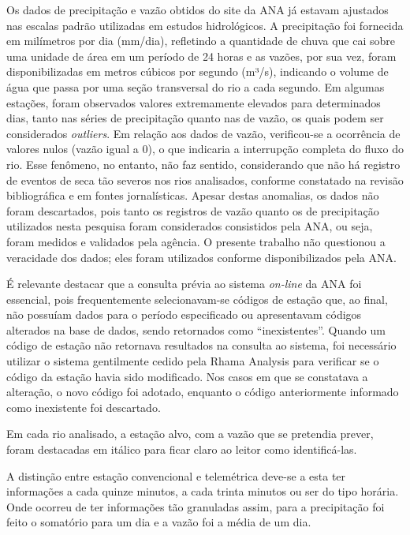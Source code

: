 Os dados de precipitação e vazão obtidos do site da ANA já estavam ajustados nas escalas padrão utilizadas em estudos hidrológicos. A precipitação foi fornecida em milímetros por dia (mm/dia), refletindo a quantidade de chuva que cai sobre uma unidade de área em um período de 24 horas e as vazões, por sua vez, foram disponibilizadas em metros cúbicos por segundo (m³/s), indicando o volume de água que passa por uma seção transversal do rio a cada segundo. Em algumas estações, foram observados valores extremamente elevados para determinados dias, tanto nas séries de precipitação quanto nas de vazão, os quais podem ser considerados \textit{outliers}. Em relação aos dados de vazão, verificou-se a ocorrência de valores nulos (vazão igual a 0), o que indicaria a interrupção completa do fluxo do rio. Esse fenômeno, no entanto, não faz sentido, considerando que não há registro de eventos de seca tão severos nos rios analisados, conforme constatado na revisão bibliográfica e em fontes jornalísticas. Apesar destas anomalias, os dados não foram descartados, pois tanto os registros de vazão quanto os de precipitação utilizados nesta pesquisa foram considerados consistidos pela ANA, ou seja, foram medidos e validados pela agência. O presente trabalho não questionou a veracidade dos dados; eles foram utilizados conforme disponibilizados pela ANA.

É relevante destacar que a consulta prévia ao sistema \textit{on-line} da ANA foi essencial, pois frequentemente selecionavam-se códigos de estação que, ao final, não possuíam dados para o período especificado ou apresentavam códigos alterados na base de dados, sendo retornados como ``inexistentes''. Quando um código de estação não retornava resultados na consulta ao sistema, foi necessário utilizar o sistema gentilmente cedido pela Rhama Analysis para verificar se o código da estação havia sido modificado. Nos casos em que se constatava a alteração, o novo código foi adotado, enquanto o código anteriormente informado como inexistente foi descartado.

Em cada rio analisado, a estação alvo, com a vazão que se pretendia prever, foram destacadas em itálico para ficar claro ao leitor como identificá-las.

A distinção entre estação convencional e telemétrica deve-se a esta ter informações a cada quinze minutos, a cada trinta minutos ou ser do tipo horária. Onde ocorreu de ter informações tão granuladas assim, para a precipitação foi feito o somatório para um dia e a vazão foi a média de um dia.

